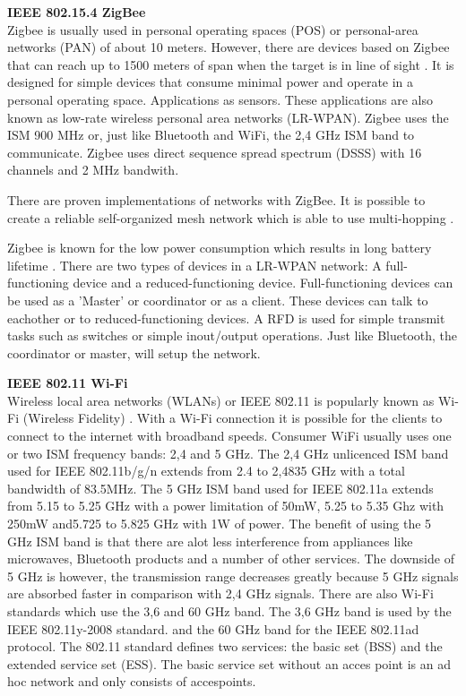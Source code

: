 \documentclass[10pt,a4paper]{article}
\begin{document}
\textbf{\large IEEE 802.15.4 ZigBee}\\
Zigbee is usually used in personal operating spaces (POS) or personal-area networks (PAN) of about 10 meters. \cite{combook} However, there are devices based on Zigbee that can reach up to 1500 meters of span when the target is in line of sight \cite{zigbeewiki}. It is designed for simple devices that consume minimal power and operate in a personal operating space. Applications as sensors. These applications are also known as low-rate wireless personal area networks (LR-WPAN). \cite{comparitivestudywirelessprotocols} Zigbee uses the ISM 900 MHz or, just like Bluetooth and WiFi, the 2,4 GHz ISM band to communicate. Zigbee uses direct sequence spread spectrum (DSSS) with 16 channels and 2 MHz bandwith.

There are proven implementations of networks with ZigBee. It is possible to create a reliable self-organized mesh network which is able to use multi-hopping \cite{comparitivestudywirelessprotocols}.

Zigbee is known for the low power consumption which results in long battery lifetime \cite{performanceevaluationlowratewirelesspan}. There are two types of devices in a LR-WPAN network: A full-functioning device and a reduced-functioning device. Full-functioning devices can be used as a 'Master' or coordinator or as a client. These devices can talk to eachother or to reduced-functioning devices. A RFD is used for simple transmit tasks such as switches or simple inout/output operations. Just like Bluetooth, the coordinator or master, will setup the network.

\textbf{\large IEEE 802.11 Wi-Fi}\\
Wireless local area networks (WLANs) or IEEE 802.11 is popularly known as Wi-Fi (Wireless Fidelity) \cite{wirelessmeshnetworksopportunitiesandchallenges}. With a Wi-Fi connection it is possible for the clients to connect to the internet with broadband speeds. Consumer WiFi usually uses one or two ISM frequency bands: 2,4 and 5 GHz. The 2,4 GHz unlicenced ISM band used for IEEE 802.11b/g/n extends from 2.4 to 2,4835 GHz with a total bandwidth of 83.5MHz. The 5 GHz ISM band used for IEEE 802.11a extends from 5.15 to 5.25 GHz with a power limitation of 50mW, 5.25 to 5.35 Ghz with 250mW and5.725 to 5.825 GHz with 1W of power.\cite{combook} The benefit of using the 5 GHz ISM band is that there are alot less interference from appliances like microwaves, Bluetooth products and a number of other services. The downside of 5 GHz is however, the transmission range decreases greatly because 5 GHz signals are absorbed faster in comparison with 2,4 GHz signals. \cite{combook} There are also Wi-Fi standards which use the 3,6 and 60 GHz band. The 3,6 GHz band is used by the IEEE 802.11y-2008 standard. and the 60 GHz band for the IEEE 802.11ad protocol. The 802.11 standard defines two services: the basic set (BSS) and the extended service set (ESS). The basic service set without an acces point is an ad hoc network and only consists of accespoints. 
\end{document}
